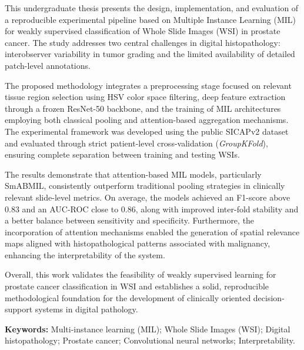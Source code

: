 This undergraduate thesis presents the design, implementation, and evaluation of a reproducible experimental pipeline based on Multiple Instance Learning (MIL) for weakly supervised classification of Whole Slide Images (WSI) in prostate cancer. The study addresses two central challenges in digital histopathology: interobserver variability in tumor grading and the limited availability of detailed patch-level annotations.\newline

The proposed methodology integrates a preprocessing stage focused on relevant tissue region selection using HSV color space filtering, deep feature extraction through a frozen ResNet-50 backbone, and the training of MIL architectures employing both classical pooling and attention-based aggregation mechanisms. The experimental framework was developed using the public SICAPv2 dataset and evaluated through strict patient-level cross-validation (\textit{GroupKFold}), ensuring complete separation between training and testing WSIs.\newline

The results demonstrate that attention-based MIL models, particularly SmABMIL, consistently outperform traditional pooling strategies in clinically relevant slide-level metrics. On average, the models achieved an F1-score above 0.83 and an AUC-ROC close to 0.86, along with improved inter-fold stability and a better balance between sensitivity and specificity. Furthermore, the incorporation of attention mechanisms enabled the generation of spatial relevance maps aligned with histopathological patterns associated with malignancy, enhancing the interpretability of the system.\newline

Overall, this work validates the feasibility of weakly supervised learning for prostate cancer classification in WSI and establishes a solid, reproducible methodological foundation for the development of clinically oriented decision-support systems in digital pathology.

\medskip
\textbf{Keywords:} Multi-instance learning (MIL); Whole Slide Images (WSI); Digital histopathology; Prostate cancer; Convolutional neural networks; Interpretability.